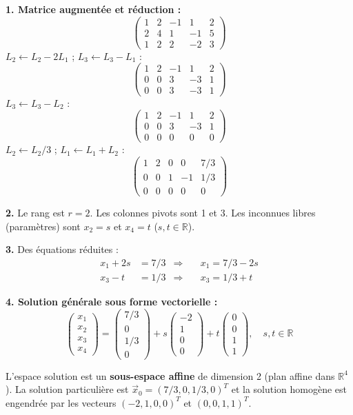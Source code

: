 \documentclass[12pt,a4paper]{article}
\begin{document}
\begin{boitecorrige}
\textbf{1. Matrice augmentée et réduction :}
\[
\left(\begin{array}{cccc|c}1&2&-1&1&2\\2&4&1&-1&5\\1&2&2&-2&3\end{array}\right)
\]
$L_2 \leftarrow L_2 - 2L_1$ ; $L_3 \leftarrow L_3 - L_1$ :
\[
\left(\begin{array}{cccc|c}1&2&-1&1&2\\0&0&3&-3&1\\0&0&3&-3&1\end{array}\right)
\]
$L_3 \leftarrow L_3 - L_2$ :
\[
\left(\begin{array}{cccc|c}1&2&-1&1&2\\0&0&3&-3&1\\0&0&0&0&0\end{array}\right)
\]
$L_2 \leftarrow L_2/3$ ; $L_1 \leftarrow L_1 + L_2$ :
\[
\left(\begin{array}{cccc|c}1&2&0&0&7/3\\0&0&1&-1&1/3\\0&0&0&0&0\end{array}\right)
\]

\textbf{2.} Le rang est $r=2$. Les colonnes pivots sont 1 et 3. Les inconnues libres (paramètres) sont $x_2 = s$ et $x_4 = t$ ($s,t\in\mathbb{R}$).

\textbf{3.} Des équations réduites :
\begin{align*}
x_1 + 2s &= 7/3 &\Rightarrow& \quad x_1 = 7/3 - 2s \\
x_3 - t &= 1/3  &\Rightarrow& \quad x_3 = 1/3 + t
\end{align*}

\textbf{4. Solution générale sous forme vectorielle :}
\[
\begin{pmatrix}x_1\\x_2\\x_3\\x_4\end{pmatrix}
= \begin{pmatrix}7/3\\0\\1/3\\0\end{pmatrix}
+ s\begin{pmatrix}-2\\1\\0\\0\end{pmatrix}
+ t\begin{pmatrix}0\\0\\1\\1\end{pmatrix}, \quad s,t\in\mathbb{R}
\]

L'espace solution est un \textbf{sous-espace affine} de dimension 2 (plan affine dans $\mathbb{R}^4$). La solution particulière est $\vec{x}_0 = (7/3, 0, 1/3, 0)^T$ et la solution homogène est engendrée par les vecteurs $(-2,1,0,0)^T$ et $(0,0,1,1)^T$.
\end{boitecorrige}

\ifdefined\inMainDoc\else
\end{document}
